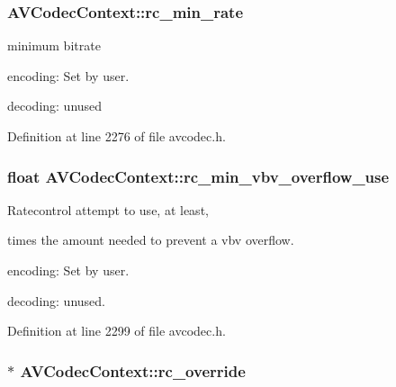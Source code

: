 \subsubsection[{\texorpdfstring{rc\+\_\+min\+\_\+rate}{rc_min_rate}}]{ A\+V\+Codec\+Context\+::rc\+\_\+min\+\_\+rate}\hypertarget{struct_a_v_codec_context_a5829c395fd6328c258379f2c3c11d40d}{}\label{struct_a_v_codec_context_a5829c395fd6328c258379f2c3c11d40d}
minimum bitrate
\begin{DoxyItemize}
\item encoding\+: Set by user.
\item decoding\+: unused 
\end{DoxyItemize}

Definition at line 2276 of file avcodec.\+h.

\subsubsection[{\texorpdfstring{rc\+\_\+min\+\_\+vbv\+\_\+overflow\+\_\+use}{rc_min_vbv_overflow_use}}]{\setlength{\rightskip}{0pt plus 5cm}float A\+V\+Codec\+Context\+::rc\+\_\+min\+\_\+vbv\+\_\+overflow\+\_\+use}\hypertarget{struct_a_v_codec_context_ab7380222079393197e5d6fdce042b2dd}{}\label{struct_a_v_codec_context_ab7380222079393197e5d6fdce042b2dd}
Ratecontrol attempt to use, at least, 

times the amount needed to prevent a vbv overflow.
\begin{DoxyItemize}
\item encoding\+: Set by user.
\item decoding\+: unused. 
\end{DoxyItemize}

Definition at line 2299 of file avcodec.\+h.

\subsubsection[{\texorpdfstring{rc\+\_\+override}{rc_override}}]{$\ast$ A\+V\+Codec\+Context\+::rc\+\_\+override}\hypertarget{struct_a_v_codec_context_adaabc10c6216da54ddf1aa454d64418c}{}\label{struct_a_v_codec_context_adaabc10c6216da54ddf1aa454d64418c}


